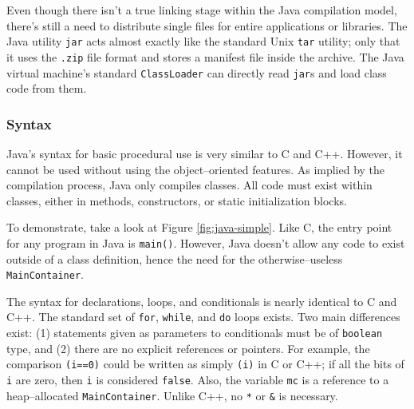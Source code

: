 Even though there isn't a true linking stage within the Java compilation
model, there's still a need to distribute single files for entire applications
or libraries. The Java utility \texttt{jar} acts almost exactly like the
standard Unix \texttt{tar} utility; only that it uses the \texttt{.zip} file
format and stores a manifest file inside the archive. The Java virtual
machine's standard \texttt{ClassLoader} can directly read \texttt{jar}s and
load class code from them.



\subsubsection{Syntax}

Java's syntax for basic procedural use is very similar to C and C++. However,
it cannot be used without using the object--oriented features. As implied by
the compilation process, Java only compiles classes. All code must exist
within classes, either in methods, constructors, or static initialization
blocks.

To demonstrate, take a look at Figure \ref{fig:java-simple}. Like C, the entry
point for any program in Java is \texttt{main()}. However, Java doesn't allow
any code to exist outside of a class definition, hence the need for the
otherwise--useless \texttt{MainContainer}.

The syntax for declarations, loops, and conditionals is nearly identical to C
and C++. The standard set of \texttt{for}, \texttt{while}, and \texttt{do}
loops exists. Two main differences exist: (1) statements given as parameters
to conditionals must be of \texttt{boolean} type, and (2) there are no
explicit references or pointers. For example, the comparison \texttt{(i==0)}
could be written as simply \texttt{(i)} in C or C++; if all the bits of
\texttt{i} are zero, then \texttt{i} is considered \texttt{false}. Also, the
variable \texttt{mc} is a reference to a heap--allocated
\texttt{MainContainer}. Unlike C++, no \texttt{*} or \texttt{\&} is necessary.

